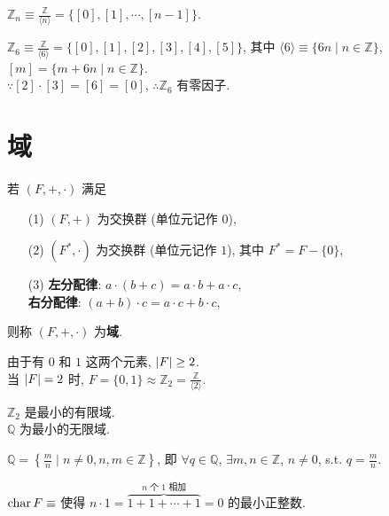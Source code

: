 \documentclass{note}
\begin{document}
\begin{df}[剩余类环]
    $\mathbb{Z}_n\equiv\frac{\mathbb{Z}}{\langle n\rangle}=\{[0],[1],\cdots,[n-1]\}$.
\end{df}

\begin{eg}
    $\mathbb{Z}_6\equiv\frac{\mathbb{Z}}{\langle 6\rangle}=\{[0],[1],[2],[3],[4],[5]\}$, 其中 $\langle 6\rangle\equiv\{6n\mid n\in\mathbb{Z}\}$, $[m]=\{m+6n\mid n\in\mathbb{Z}\}$.\\
    $\because[2]\cdot[3]=[6]=[0]$, $\therefore\mathbb{Z}_6$ 有零因子.
\end{eg}

\section{域}
\begin{df}[域]
    若 $(F,+,\cdot)$ 满足
    \begin{itemize}
        \item[(1)] $(F,+)$ 为交换群 (单位元记作 $0$),
        \item[(2)] $(F^*,\cdot)$ 为交换群 (单位元记作 $1$), 其中 $F^*=F-\{0\}$,
        \item[(3)] \textbf{左分配律}: $a\cdot(b+c)=a\cdot b+a\cdot c$,\\
        \textbf{右分配律}: $(a+b)\cdot c=a\cdot c+b\cdot c$,
    \end{itemize}
    则称 $(F,+,\cdot)$ 为\textbf{域}.
\end{df}

由于有 $0$ 和 $1$ 这两个元素, $\left\lvert F\right\rvert\geq 2$.\\
当 $\left\lvert F\right\rvert=2$ 时, $F=\{0,1\}\approx\mathbb{Z}_2=\frac{\mathbb{Z}}{\langle 2\rangle}$.

\begin{eg}
    $\mathbb{Z}_2$ 是最小的有限域.\\
    $\mathbb{Q}$ 为最小的无限域.
\end{eg}

\begin{df}[有理数]
    $\mathbb{Q}=\left\{\frac{m}{n}\mid n\neq 0,n,m\in\mathbb{Z}\right\}$, 即 $\forall q\in\mathbb{Q}$, $\exists m,n\in\mathbb{Z}$, $n\neq 0$, s.t. $q=\frac{m}{n}$.
\end{df}

\begin{df}[域的特征]
    $\operatorname{char} F\equiv$ 使得 $n\cdot 1=\overbrace{1+1+\cdots+1}^{\text{$n$ 个 $1$ 相加}}=0$ 的最小正整数.
\end{df}
\end{document}
